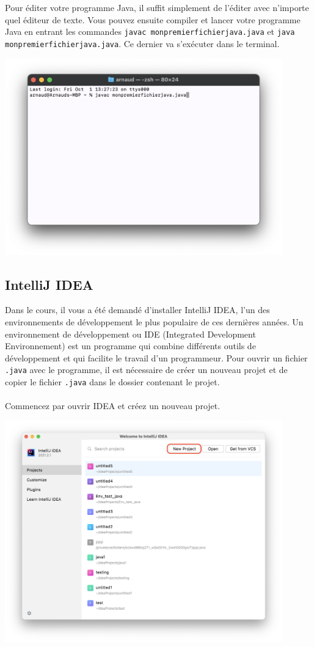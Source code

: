 Pour éditer votre programme Java, il suffit simplement de l'éditer avec n'importe quel éditeur de texte.
Vous pouvez ensuite compiler et lancer votre programme Java en entrant les commandes \lstinline{javac monpremierfichierjava.java} et \lstinline{java monpremierfichierjava.java}. Ce dernier va s'exécuter dans le terminal.
\begin{center}
	\includegraphics[width=12cm]{4j}
\end{center}
 

\subsection{IntelliJ IDEA}

Dans le cours, il vous a été demandé d'installer IntelliJ IDEA, l'un des environnements de développement le plus populaire de ces dernières années. Un environnement de développement ou IDE (Integrated Development Environnement) est un programme qui combine différents outils de développement et qui facilite le travail d'un programmeur. Pour ouvrir un fichier \lstinline{.java} avec le programme, il est nécessaire de créer un nouveau projet et de copier le fichier \lstinline{.java} dans le dossier contenant le projet.
\\\\
Commencez par ouvrir IDEA et créez un nouveau projet.

\begin{center}
	\includegraphics[width=12cm]{5j}	
\end{center}
 

